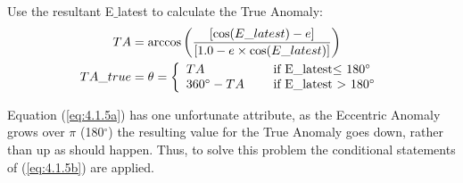 \documentclass[10pt,preprint]{aastex}
\begin{document}
Use the resultant E$\_$latest to calculate the True Anomaly:
\begin{subequations}
\begin{align}
\label{eq:4.1.5a}
TA& = \arccos \bigg( \frac{[\cos(E\_latest) - e]}{[1.0 - e \times \cos(E\_latest)]} \bigg)\\
\label{eq:4.1.5b}
TA\_true& = \theta = \left\{ \begin{array}{l l} TA& \quad \text{ if E$\_$latest$\leq$ 180$^{\circ}$}\\ 360^{\circ}  - TA& \quad \text{ if E$\_$latest $>$ 180$^{\circ}$} \end{array}\right.
\end{align}
\end{subequations}

Equation (\ref{eq:4.1.5a}) has one unfortunate attribute, as the Eccentric Anomaly grows over $\pi$ (180$^{\circ}$) the resulting value for the True Anomaly goes down, rather than up as should happen.  Thus, to solve this problem the conditional statements of (\ref{eq:4.1.5b}) are applied.\\  
\pagebreak
\end{document}
